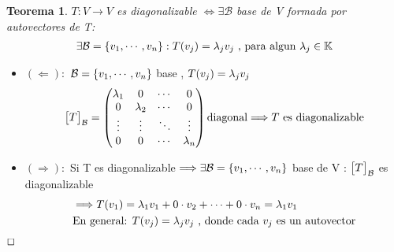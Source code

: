 \documentclass[]{article}
\newtheorem{theorem}{Teorema}
\newenvironment{proof}{\noindent{\bf Prueba:}}{$\hfill \Box$ \vspace{10pt}}
\newcommand{\K}{
    \mathbb{K}
}
\newcommand{\ida}{\Longrightarrow}
\newcommand{\vuelta}{\Longleftarrow}
\newcommand{\base}{\text{$\mathcal{B}$}}
\begin{document}
\begin{theorem}
    $T:V \to V$ es diagonalizable $\iff \exists \base$ base de V formada por autovectores de T:
    \begin{align*}
        \exists \base=\conjunto{\vc{1},\cdots,\vc{n}} : \T{\vc{j}}=\lambda_j\vc{j} \text{ , para algun } \lambda_j \in \K
    \end{align*}
\end{theorem}
\begin{proof}
    \begin{itemize}
        \item $(\vuelta):$ $\base=\conjunto{\vc{1},\cdots,\vc{n}}$ base , $\text{$T({\text{$v_{j}$}})$}=\lambda_j\text{$v_{j}$}$
        \begin{align*}
            \cbs{T}{\base}{}=\begin{pmatrix}
                \lambda_1 & 0         & \cdots & 0     \\
                0         & \lambda_2 & \cdots & 0      \\
                \vdots    & \vdots    & \ddots & \vdots  \\
                0         & 0         & \cdots & \lambda_n\\
            \end{pmatrix}
            \text{diagonal} \ida T \text{ es diagonalizable}
        \end{align*}
        \item $(\ida):$ Si T es diagonalizable $\ida \exists \base=\conjunto{\vc{1},\cdots,\vc{n}}$ base de V :
        $\cbs{T}{\base}{}$ es diagonalizable
        \begin{align*}
            &\ida \T{\vc{1}}=\lambda_1\vc{1} + 0\cdot \vc{2}+\cdots + 0\cdot \vc{n}= \lambda_1\vc{1}\\
            &\text{En general: } \T{\vc{j}}=\lambda_j\vc{j} \text{ , donde cada \vc{j} es un autovector}
        \end{align*}
    \end{itemize}
\end{proof}
\end{document}
